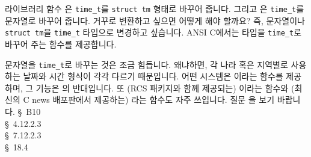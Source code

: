 \begin{faq}
	라이브러리 함수 은 \verb+time_t+를
        \verb+struct tm+ 형태로 바꾸어 줍니다.  그리고 은 
        \verb+time_t+를 문자열로 바꾸어 줍니다.  거꾸로 변환하고 싶으면
        어떻게 해야 할까요? 즉, 문자열이나 \verb+struct tm+을 
        \verb+time_t+ 타입으로 변경하고 싶습니다.
\A
	ANSI C에서는  타입을 \verb+time_t+로 바꾸어 주는
	 함수를 제공합니다.

	문자열을 \verb+time_t+로 바꾸는 것은 조금 힘듭니다.  왜냐하면,
	각 나라 혹은 지역별로 사용하는 날짜와 시간 형식이 각각 다르기
	때문입니다.  어떤 시스템은 이라는 함수를 제공하며,
	그 기능은 의 반대입니다.  또 (RCS 패키지와 함께
	제공되는) 이라는 함수와 (최신의 C news 배포판에서
	제공하는) 라는 함수도 자주 쓰입니다.
	질문 을 보기 바랍니다.
\R
	\cite{kr2} \S\ B10  \\
        \cite{ansi} \S\ 4.12.2.3 \\
	\cite{c89} \S\ 7.12.2.3 \\
	\cite{hs} \S\ 18.4 
\end{faq}


